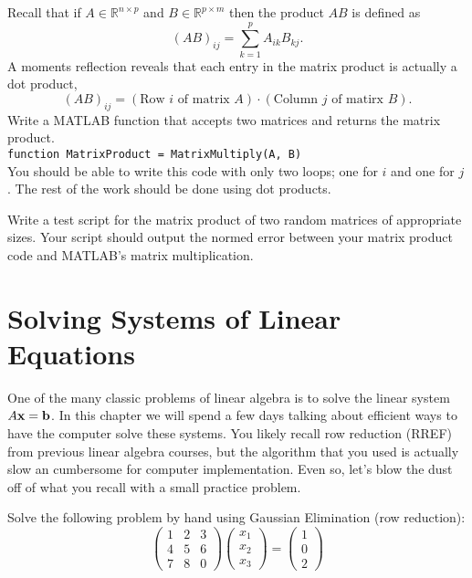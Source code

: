 \begin{problem}
    Recall that if $A \in \mathbb{R}^{n \times p}$ and $B \in \mathbb{R}^{p \times m}$
    then the product $AB$ is defined as
    \[ \left( AB \right)_{ij} = \sum_{k=1}^p A_{ik} B_{kj}. \]
    A moments reflection reveals that each entry in the matrix product is actually a dot
    product, 
    \[ \left( AB \right)_{ij} = \left( \text{Row $i$ of matrix $A$} \right) \cdot \left(
    \text{Column $j$ of matirx $B$} \right). \]
    Write a MATLAB function that accepts two matrices and returns the matrix product. \\
    \verb|function MatrixProduct = MatrixMultiply(A, B)| \\
    You
    should be able to write this code with only two loops; one for $i$ and one for $j$.
    The rest of the work should be done using dot products.
\end{problem}
\begin{problem}
    Write a test script for the matrix product of two random matrices of appropriate sizes.  Your
    script should output the normed error between your matrix product code and MATLAB's
    matrix multiplication.
\end{problem}



\section{Solving Systems of Linear Equations}
One of the many classic problems of linear algebra is to solve the linear system $A {\bf x} =
{\bf b}$. In this chapter we will spend a few days talking about efficient ways to have the computer solve
these systems. You likely recall row reduction (RREF) from previous linear algebra
courses, but the algorithm that you used is actually slow an cumbersome for computer
implementation.  Even so, let's blow the dust off of what you recall with a small practice
problem.

\begin{problem}
    Solve the following problem by hand using Gaussian Elimination (row reduction):
    \[ \begin{pmatrix} 1 & 2 & 3 \\ 4 & 5 & 6 \\ 7 & 8 & 0 \end{pmatrix} \begin{pmatrix}
            x_1 \\ x_2 \\ x_3 \end{pmatrix} = \begin{pmatrix} 1 \\ 0 \\ 2\end{pmatrix} \]
\end{problem}


